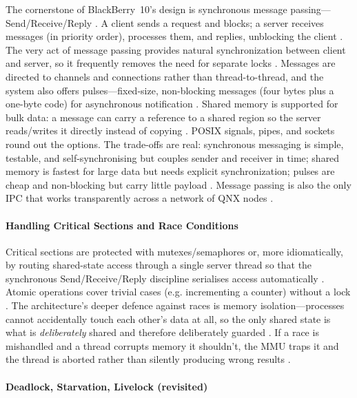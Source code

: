The cornerstone of BlackBerry~10's design is synchronous message
passing---Send/Receive/Reply \citep{qnx_ipc}. A client sends a request and
blocks; a server receives messages (in priority order), processes
them, and replies, unblocking the client \citep{qnx_ipc}. The very act
of message passing provides natural synchronization between client and
server, so it frequently removes the need for separate locks
\citep{qnx_ipc, qnx_kernel_sync}. Messages are directed to channels
and connections rather than thread-to-thread, and the system also
offers pulses---fixed-size, non-blocking messages (four bytes plus a
one-byte code) for asynchronous notification \citep{qnx_ipc}. Shared
memory is supported for bulk data: a message can carry a reference to
a shared region so the server reads/writes it directly instead of
copying \citep{qnx_ipc_shmem}. POSIX signals, pipes, and sockets round
out the options. The trade-offs are real: synchronous messaging is
simple, testable, and self-synchronising but couples sender and
receiver in time; shared memory is fastest for large data but needs
explicit synchronization; pulses are cheap and non-blocking but carry
little payload \citep{qnx_ipc, qnx_ipc_shmem}. Message passing is also
the only IPC that works transparently across a network of QNX nodes
\citep{qnx_kernel_sync}.

\paragraph{Handling Critical Sections and Race Conditions}

Critical sections are protected with mutexes/semaphores or, more
idiomatically, by routing shared-state access through a single server
thread so that the synchronous Send/Receive/Reply discipline serialises
access automatically \citep{qnx_ipc, qnx_kernel_sysarch}. Atomic
operations cover trivial cases (e.g. incrementing a counter) without a
lock \citep{qnx_kernel_sysarch}. The architecture's deeper defence
against races is memory isolation---processes cannot accidentally touch
each other's data at all, so the only shared state is what is
\emph{deliberately} shared and therefore deliberately guarded
\citep{qnx_memman}. If a race is mishandled and a thread corrupts
memory it shouldn't, the MMU traps it and the thread is aborted rather
than silently producing wrong results \citep{qnx_memman}.

\paragraph{Deadlock, Starvation, Livelock (revisited)}

